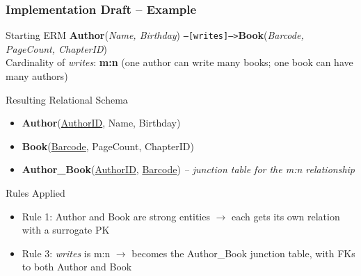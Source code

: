\begin{frame}
  \frametitle{Implementation Draft -- Example}

  \begin{block}{Starting ERM}
    \textbf{Author}(\textit{Name, Birthday}) \quad\texttt{--[writes]-->}\quad \textbf{Book}(\textit{Barcode, PageCount, ChapterID})\\[0.3em]
    Cardinality of \textit{writes}: \textbf{m:n} (one author can write many books; one book can have many authors)
  \end{block}

  \begin{block}{Resulting Relational Schema}
    \begin{itemize}
      \item \textbf{Author}(\underline{AuthorID}, Name, Birthday)
      \item \textbf{Book}(\underline{Barcode}, PageCount, ChapterID)
      \item \textbf{Author\_Book}(\underline{AuthorID}, \underline{Barcode}) \quad\textit{-- junction table for the m:n relationship}
    \end{itemize}
  \end{block}

  \begin{examples}{Rules Applied}
    \begin{itemize}
      \item Rule 1: Author and Book are strong entities $\to$ each gets its own relation with a surrogate PK
      \item Rule 3: \textit{writes} is m:n $\to$ becomes the Author\_Book junction table, with FKs to both Author and Book
    \end{itemize}
  \end{examples}
\end{frame}


